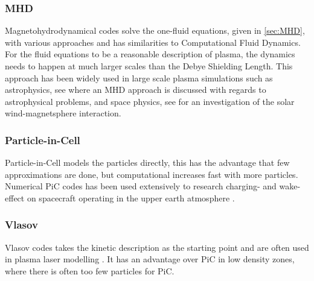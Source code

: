 	\subsubsection{MHD}
		Magnetohydrodynamical codes solve the one-fluid equations, given in \cref{sec:MHD},
		with various approaches and has
		similarities to Computational Fluid Dynamics. For the fluid equations
		to be a reasonable description of plasma, the dynamics needs to happen at much larger scales
		than the Debye Shielding Length. This approach has been widely used in large scale
		plasma simulations such as astrophysics, see \citet{hawley_numerical_1995} where an MHD approach is discussed with regards to astrophysical problems,
 		and space physics, see \citet{watanabe_global_1990} for an investigation of the solar wind-magnetsphere interaction.

	\subsubsection{Particle-in-Cell}
		Particle-in-Cell models the particles directly, this has the advantage that
		few approximations are done, but computational increases fast with more particles.
		Numerical PiC codes has been used extensively to research charging- and wake-effect on spacecraft
		operating in the upper earth atmosphere \citep{}.

	\subsubsection{Vlasov}
		Vlasov codes takes the kinetic description as the starting point and are often used
		in plasma laser modelling \citep{bertrand_nonperiodic_1990}. It has an advantage over
		PiC in low density zones, where there is often too few particles for PiC.
